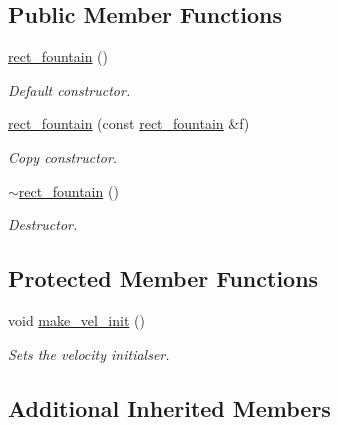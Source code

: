 \subsection*{Public Member Functions}
\begin{DoxyCompactItemize}
\item 
\mbox{\label{classphysim_1_1init_1_1rect__fountain_ad6f465c75c85e64e8fb4a1aa29dccaea}} 
\hyperlink{classphysim_1_1init_1_1rect__fountain_ad6f465c75c85e64e8fb4a1aa29dccaea}{rect\+\_\+fountain} ()
\begin{DoxyCompactList}\small\item\em Default constructor. \end{DoxyCompactList}\item 
\hyperlink{classphysim_1_1init_1_1rect__fountain_a514a1cf5c7feb99f1e2bddbfac585099}{rect\+\_\+fountain} (const \hyperlink{classphysim_1_1init_1_1rect__fountain}{rect\+\_\+fountain} \&f)
\begin{DoxyCompactList}\small\item\em Copy constructor. \end{DoxyCompactList}\item 
\mbox{\label{classphysim_1_1init_1_1rect__fountain_a30e2bfad7c8a2f49be3bc5e0d838c1a0}} 
\hyperlink{classphysim_1_1init_1_1rect__fountain_a30e2bfad7c8a2f49be3bc5e0d838c1a0}{$\sim$rect\+\_\+fountain} ()
\begin{DoxyCompactList}\small\item\em Destructor. \end{DoxyCompactList}\end{DoxyCompactItemize}
\subsection*{Protected Member Functions}
\begin{DoxyCompactItemize}
\item 
void \hyperlink{classphysim_1_1init_1_1rect__fountain_a3070a3ff21834d8a9a8315dac3e6fffe}{make\+\_\+vel\+\_\+init} ()
\begin{DoxyCompactList}\small\item\em Sets the velocity initialser. \end{DoxyCompactList}\end{DoxyCompactItemize}
\subsection*{Additional Inherited Members}


